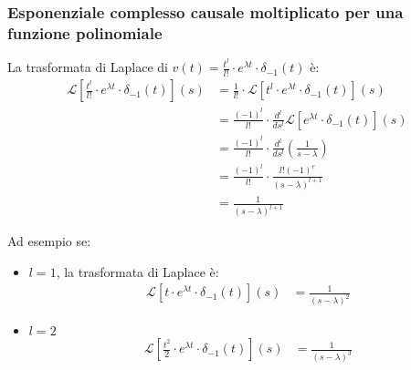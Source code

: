 \documentclass[a4paper]{article}
\begin{document}
\subsubsection{Esponenziale complesso causale moltiplicato per una funzione polinomiale}
\begin{figure}[H]
  \centering
\end{figure}
La trasformata di Laplace di \( v(t) = \frac{t^l}{l!} \cdot e^{\lambda t} \cdot \delta_{-1}(t) \) è:
\[
  \begin{aligned}
    \mathcal{L}\left[\frac{t^l}{l!} \cdot e^{\lambda t} \cdot \delta_{-1}(t)\right](s) &= 
    \frac{1}{l!} \cdot \mathcal{L}[t^l \cdot e^{\lambda t} \cdot \delta_{-1}(t)](s)\\
                                                                                       &= \frac{(-1)^l}{l!} \cdot \frac{d^{l}}{ds^{l}} \mathcal{L}\left[e^{\lambda t} \cdot \delta_{-1}(t)\right](s)\\
                                                                                       &= \frac{(-1)^l}{l!} \cdot \frac{d^{l}}{ds^{l}} \left( \frac{1}{s-\lambda} \right) \\
                                                                                       &= \frac{(-1)^l}{l!} \cdot \frac{l! (-1)^e}{(s-\lambda)^{l+1}}\\
                                                                                       &= \frac{1}{(s-\lambda)^{l+1}}
  \end{aligned}
\] 
\begin{example}
  Ad esempio se:
  \begin{itemize}
    \item 
      \( l = 1\), la trasformata di Laplace è:
      \[
        \begin{aligned}
          \mathcal{L}\left[t \cdot e^{\lambda t} \cdot \delta_{-1}(t)\right](s) &= \frac{1}{(s-\lambda)^{2}}
        \end{aligned}
      \] 
    \item \( l = 2 \) 
      \[
        \begin{aligned}
          \mathcal{L}\left[\frac{t^2}{2} \cdot e^{\lambda t} \cdot \delta_{-1}(t)\right](s) &= \frac{1}{(s-\lambda)^{3}}
        \end{aligned}
      \]
  \end{itemize}
\end{example}
\end{document}
